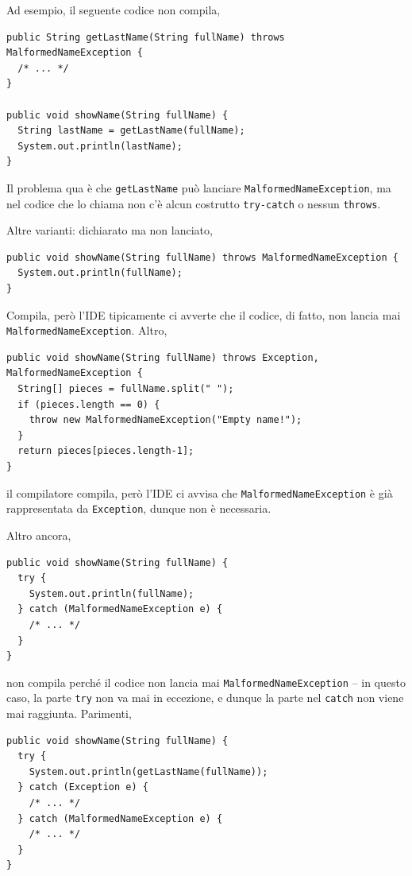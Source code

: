 \documentclass[\fontsizeclass,twocolumn]{\classname}
\theoremstyle{definition}
\theoremstyle{definition}
\begin{document}
Ad esempio, il seguente codice non compila,

\begin{lstlisting}
public String getLastName(String fullName) throws MalformedNameException {
  /* ... */
}

public void showName(String fullName) {
  String lastName = getLastName(fullName);
  System.out.println(lastName);
}
\end{lstlisting}

Il problema qua è che \texttt{getLastName} può lanciare
\texttt{MalformedNameException}, ma nel codice che lo chiama non c'è alcun
costrutto \texttt{try\--catch} o nessun \texttt{throws}.

Altre varianti: dichiarato ma non lanciato,

\begin{lstlisting}
public void showName(String fullName) throws MalformedNameException {
  System.out.println(fullName);
}
\end{lstlisting}

Compila, però l'IDE tipicamente ci avverte che il codice, di fatto, non lancia
mai \texttt{MalformedNameException}. Altro,

\begin{lstlisting}
public void showName(String fullName) throws Exception, MalformedNameException {
  String[] pieces = fullName.split(" ");
  if (pieces.length == 0) {
    throw new MalformedNameException("Empty name!");
  }
  return pieces[pieces.length-1];
}
\end{lstlisting}

il compilatore compila, però l'IDE ci avvisa che
\texttt{MalformedNameException} è già rappresentata da \texttt{Exception},
dunque non è necessaria.

Altro ancora,

\begin{lstlisting}
public void showName(String fullName) {
  try {
    System.out.println(fullName);
  } catch (MalformedNameException e) {
    /* ... */
  }
}
\end{lstlisting}

non compila perché il codice non lancia mai \texttt{MalformedNameException} --
in questo caso, la parte \texttt{try} non va mai in eccezione, e dunque la
parte nel \texttt{catch} non viene mai raggiunta. Parimenti,

\begin{lstlisting}
public void showName(String fullName) {
  try {
    System.out.println(getLastName(fullName));
  } catch (Exception e) {
    /* ... */
  } catch (MalformedNameException e) {
    /* ... */
  }
}
\end{lstlisting}
\end{document}
